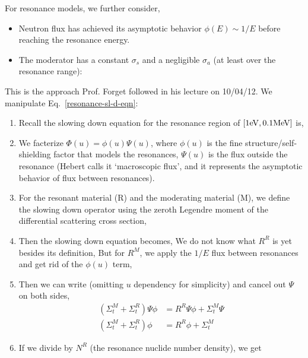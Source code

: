 \documentclass{school-22.211-notes}
\begin{document}
For resonance models, we further consider, 
\begin{itemize}
\item Neutron flux has achieved its asymptotic behavior $\phi(E) \sim 1/E$ before reaching the resonance energy. 
\item The moderator has a constant $\sigma_s$ and a negligible $\sigma_a$ (at least over the resonance range): 
\end{itemize}




\clearpage
{}
This is the approach Prof. Forget followed in his lecture on 10/04/12. We manipulate Eq.~\ref{resonance-sl-d-eqn}:
\begin{enumerate}
\item Recall the slowing down equation for the resonance region of $[1\mathrm{eV}, 0.1 \mathrm{MeV}]$ is, 

\item We facterize $\Phi(u) = \phi(u) \Psi(u)$, where $\phi(u)$ is the fine structure/self-shielding factor that models the resonances, $\Psi(u)$ is the flux outside the resonance (Hebert calls it `macroscopic flux', and it represents the asymptotic behavior of flux between resonances). 

\item For the resonant material (R) and the moderating material (M), we define the slowing down operator using the zeroth Legendre moment of the differential scattering cross section, 

\item Then the slowing down equation becomes, 
  We do not know what $R^R$ is yet besides its definition,
  But for $R^M$, we apply the $1/E$ flux between resonances and get rid of the $\phi(u)$ term, 

\item Then we can write (omitting $u$ dependency for simplicity) and cancel out $\Psi$ on both sides, 
  \begin{align}
    (\Sigma_{t}^M + \Sigma_t^R) \Psi \phi &= R^R \Psi \phi +  \Sigma_{t}^M \Psi  \\
   (\Sigma_t^M  + \Sigma_{t}^R ) \phi &=  R^R \phi + \Sigma_t^M  
  \end{align}

\item If we divide by $N^R$ (the resonance nuclide number density), we get 
\end{enumerate}
\end{document}
